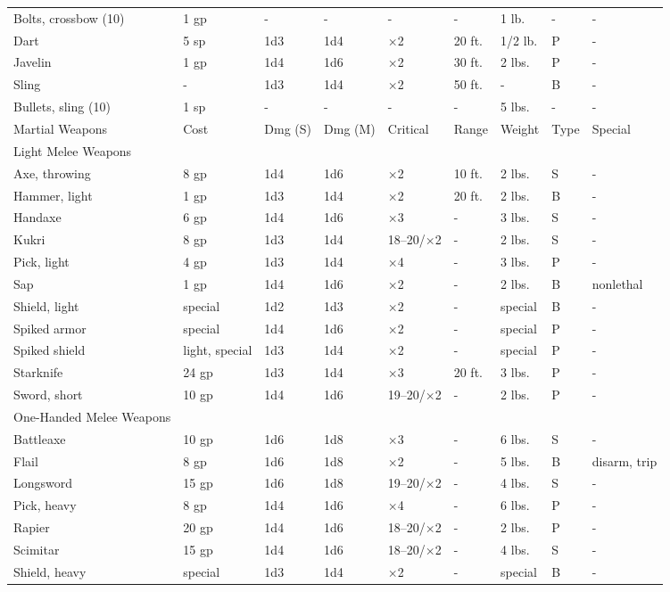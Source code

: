 \begin{table}[]
\begin{tabular}{lllllllll}
 Bolts, crossbow (10) & 1 gp & - & - & - & - & 1 lb. & - & - \\
 Dart & 5 sp & 1d3 & 1d4 & ×2 & 20 ft. & 1/2 lb. & P & - \\
 Javelin & 1 gp & 1d4 & 1d6 & ×2 & 30 ft. & 2 lbs. & P & - \\
 Sling & - & 1d3 & 1d4 & ×2 & 50 ft. & - & B & - \\
 Bullets, sling (10) & 1 sp & - & - & - & - & 5 lbs. & - & -\\
Martial Weapons & Cost & Dmg (S) & Dmg (M) & Critical & Range & Weight &  Type & Special\\
Light Melee Weapons \\
 Axe, throwing & 8 gp & 1d4 & 1d6 & ×2 & 10 ft. & 2 lbs. & S & - \\
 Hammer, light & 1 gp & 1d3 & 1d4 & ×2 & 20 ft. & 2 lbs. & B & - \\
 Handaxe & 6 gp & 1d4 & 1d6 & ×3 & - & 3 lbs. & S & - \\
 Kukri & 8 gp & 1d3 & 1d4 & 18–20/×2 & - & 2 lbs. & S & - \\
 Pick, light & 4 gp & 1d3 & 1d4 & ×4 & - & 3 lbs. & P & - \\
 Sap & 1 gp & 1d4 & 1d6 & ×2 & - & 2 lbs. & B & nonlethal \\
 Shield, light & special & 1d2 & 1d3 & ×2 & - & special & B & - \\
 Spiked armor & special & 1d4 & 1d6 & ×2 & - & special & P & - \\
 Spiked shield & light, special & 1d3 & 1d4 & ×2 & - & special & P & - \\
 Starknife & 24 gp & 1d3 & 1d4 & ×3 & 20 ft. & 3 lbs. & P & - \\
 Sword, short & 10 gp & 1d4 & 1d6 & 19–20/×2 & - & 2 lbs. & P & - \\
 One-Handed Melee Weapons \\
 Battleaxe & 10 gp & 1d6 & 1d8 & ×3 & - & 6 lbs. & S & - \\
 Flail & 8 gp & 1d6 & 1d8 & ×2 & - & 5 lbs. & B & disarm, trip \\
 Longsword & 15 gp & 1d6 & 1d8 & 19–20/×2 & - & 4 lbs. & S & - \\
 Pick, heavy & 8 gp & 1d4 & 1d6 & ×4 & - & 6 lbs. & P & - \\
 Rapier & 20 gp & 1d4 & 1d6 & 18–20/×2 & - & 2 lbs. & P & - \\
 Scimitar & 15 gp & 1d4 & 1d6 & 18–20/×2 & - & 4 lbs. & S & - \\
 Shield, heavy & special & 1d3 & 1d4 & ×2 & - & special & B & - \\

\end{tabular}
\end{table}
